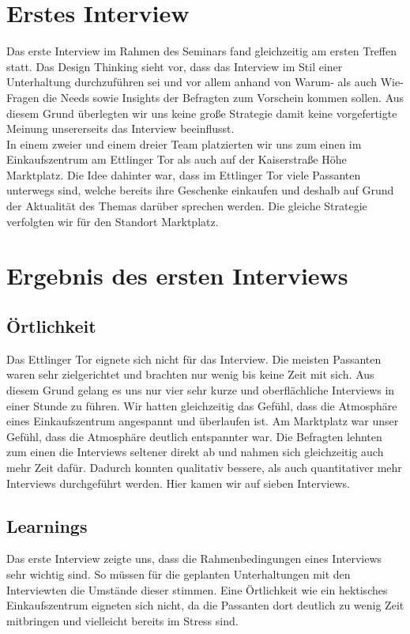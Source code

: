 \documentclass[12pt,ngerman, fleqn]{book} %
\begin{document}
\section{Erstes Interview}
Das erste Interview im Rahmen des Seminars fand gleichzeitig am ersten Treffen statt. Das Design Thinking sieht vor, dass das Interview im Stil einer Unterhaltung durchzuführen sei und vor allem anhand von Warum- als auch Wie-Fragen die Needs sowie Insights der Befragten zum Vorschein kommen sollen. Aus diesem Grund überlegten wir uns keine große Strategie damit keine vorgefertigte Meinung unsererseits das Interview beeinflusst.\\
In einem zweier und einem dreier Team platzierten wir uns zum einen im Einkaufszentrum am Ettlinger Tor als auch auf der Kaiserstraße Höhe Marktplatz. Die Idee dahinter war, dass im Ettlinger Tor viele Passanten unterwegs sind, welche bereits ihre Geschenke einkaufen und deshalb auf Grund der Aktualität des Themas darüber sprechen werden. Die gleiche Strategie verfolgten wir für den Standort Marktplatz.

\section{Ergebnis des ersten Interviews}

\subsection{Örtlichkeit}
Das Ettlinger Tor eignete sich nicht für das Interview. Die meisten Passanten waren sehr zielgerichtet und brachten nur wenig bis keine Zeit mit sich. Aus diesem Grund gelang es uns nur vier sehr kurze und oberflächliche Interviews in einer Stunde zu führen. Wir hatten gleichzeitig das Gefühl, dass die Atmosphäre eines Einkaufszentrum angespannt und überlaufen ist.
Am Marktplatz war unser Gefühl, dass die Atmosphäre deutlich entspannter war. Die Befragten  lehnten zum einen die Interviews seltener direkt ab und nahmen sich gleichzeitig auch mehr Zeit dafür. Dadurch konnten qualitativ bessere, als auch quantitativer mehr Interviews durchgeführt werden. Hier kamen wir auf sieben Interviews.

\subsection{Learnings}
Das erste Interview zeigte uns, dass die Rahmenbedingungen eines Interviews sehr wichtig sind. So müssen für die geplanten Unterhaltungen mit den Interviewten die Umstände dieser stimmen. Eine Örtlichkeit wie ein hektisches Einkaufszentrum eigneten sich nicht, da die Passanten dort deutlich zu wenig Zeit mitbringen und vielleicht bereits im Stress sind.\\
\end{document}
